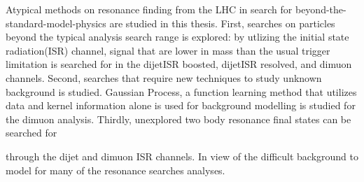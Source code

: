 %
%
%
%
%
%
Atypical methods on resonance finding from the LHC in search for beyond-the-standard-model-physics are studied in this thesis. First, searches on particles beyond the typical analysis search range is explored: by utlizing the initial state radiation(ISR) channel, signal that are lower in mass than the usual trigger limitation is searched for in the dijetISR boosted, dijetISR resolved, and dimuon channels. Second, searches that require new techniques to study unknown background is studied. Gaussian Process, a function learning method that utilizes data and kernel information alone is used for background modelling is studied for the dimuon analysis. Thirdly, unexplored two body resonance final states can be searched for 

through the dijet and dimuon ISR channels. In view of the difficult background to model for many of the resonance searches analyses. 

